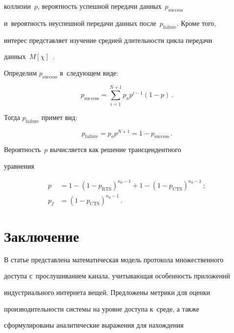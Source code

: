 коллизии~$p$, вероятность успешной передачи данных~$p_{\mathrm{success}}$ 


и~вероятность неуспешной передачи данных после~$p_{\mathrm{failure}}$. Кроме того, 


интерес представляет изучение средней длительности цикла передачи 


данных~$M[\chi]$~\cite{7-gai}.





Определим $p_{\mathrm{success}}$ в~следующем виде:


$$


p_{\mathrm{success}}=\sum\limits_{i=1}^{N+1} p_a p^{i-1} (1-p)\,.


$$


Тогда $p_{\mathrm{failure}}$ примет вид:


$$


p_{\mathrm{failure}}= p_a p^{N+1} =1-p_{\mathrm{success}}\,.


$$


Вероятность~$p$ вычисляется как решение трансцендентного 


уравнения~\cite{8-gai}


\begin{align*}


p&=1-\left( 1-p_{\mathrm{RTS}}\right)^{n_\theta -1} +1- \left( 1-p_{\mathrm{CTS}}  


\right)^{n_\theta-1}\,;\\


p_f&= \left(1-p_{\mathrm{CTS}}\right)^{n_\theta-1}\,.


\end{align*}





\section{Заключение}





    В статье представлена математическая модель протокола множественного 


доступа с~прослушиванием канала, учитывающая особенность приложений 


ин\-дуст\-ри\-аль\-но\-го интернета вещей. Предложены метрики для оценки 


производительности системы на уровне доступа к~среде, а также 


сформулированы аналитические выражения для нахождения  


